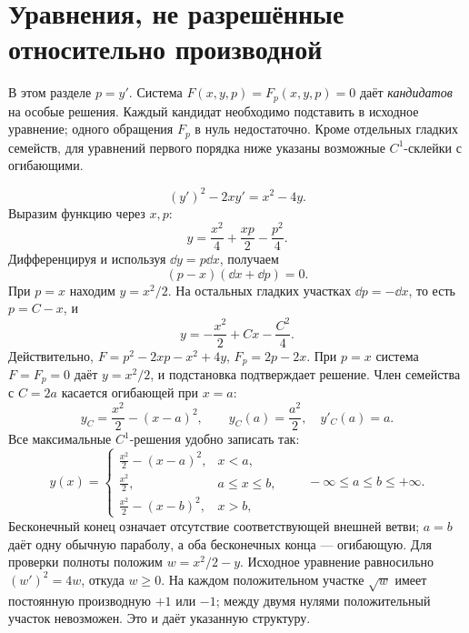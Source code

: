 \section{Уравнения, не разрешённые относительно производной}

В этом разделе $p=y'$. Система $F(x,y,p)=F_p(x,y,p)=0$ даёт
\emph{кандидатов} на особые решения. Каждый кандидат необходимо
подставить в исходное уравнение; одного обращения $F_p$ в нуль недостаточно.
Кроме отдельных гладких семейств, для уравнений первого порядка
ниже указаны возможные $C^1$-склейки с огибающими.

\[
 (y')^2-2xy'=x^2-4y.
\]
Выразим функцию через $x,p$:
\[
 y=\frac{x^2}4+\frac{xp}2-\frac{p^2}4.
\]
Дифференцируя и используя $\dd y=p\dd x$, получаем
\[
 (p-x)(\dd x+\dd p)=0.
\]
При $p=x$ находим $y=x^2/2$. На остальных гладких участках
$\dd p=-\dd x$, то есть $p=C-x$, и
\[
 y=-\frac{x^2}2+Cx-\frac{C^2}4.
\]
Действительно, $F=p^2-2xp-x^2+4y$, $F_p=2p-2x$.
При $p=x$ система $F=F_p=0$ даёт $y=x^2/2$, и подстановка подтверждает
решение. Член семейства с $C=2a$ касается огибающей при $x=a$:
\[
 y_C=\frac{x^2}2-(x-a)^2,\qquad
 y_C(a)=\frac{a^2}2,\quad y'_C(a)=a.
\]
Все максимальные $C^1$-решения удобно записать так:
\[
 y(x)=\begin{cases}
 \frac{x^2}2-(x-a)^2,&x<a,\\
 \frac{x^2}2,&a\le x\le b,\\
 \frac{x^2}2-(x-b)^2,&x>b,
 \end{cases}
 \qquad -\infty\le a\le b\le+\infty.
\]
Бесконечный конец означает отсутствие соответствующей внешней ветви;
$a=b$ даёт одну обычную параболу, а оба бесконечных конца --- огибающую.
Для проверки полноты положим $w=x^2/2-y$. Исходное уравнение равносильно
$(w')^2=4w$, откуда $w\ge0$. На каждом положительном участке
$\sqrt w$ имеет постоянную производную $+1$ или $-1$;
между двумя нулями положительный участок невозможен. Это и даёт
указанную структуру.

\begin{center}
\end{center}

